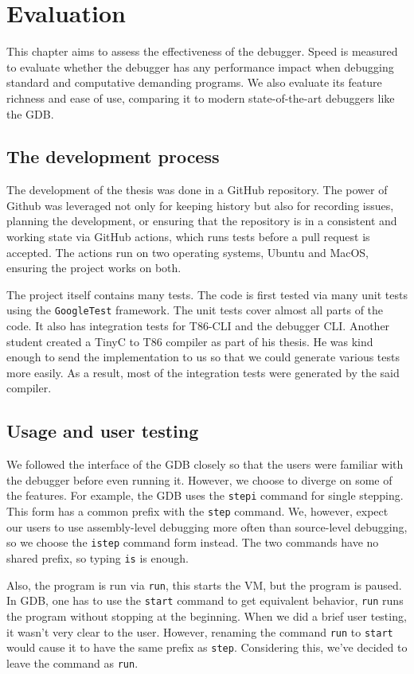 \chapter{Evaluation}
This chapter aims to assess the effectiveness of the debugger. Speed is
measured to evaluate whether the debugger has any performance impact when
debugging standard and computative demanding programs. We also evaluate its
feature richness and ease of use, comparing it to modern state-of-the-art
debuggers like the GDB.

\section{The development process}
The development of the thesis was done in a GitHub repository. The power of
Github was leveraged not only for keeping history but also for recording
issues, planning the development, or ensuring that the repository is in a
consistent and working state via GitHub actions, which runs tests before a pull
request is accepted. The actions run on two operating systems, Ubuntu and
MacOS, ensuring the project works on both.

The project itself contains many tests. The code is first tested via many unit
tests using the \texttt{GoogleTest} framework. The unit tests cover almost all
parts of the code. It also has integration tests for T86-CLI and the debugger
CLI. Another student created a TinyC to T86 compiler as part of
his thesis. He was kind enough to send the implementation to us so that we
could generate various tests more easily. As a result, most of the integration
tests were generated by the said compiler.

\section{Usage and user testing}
We followed the interface of the GDB closely so that the users were familiar
with the debugger before even running it. However, we choose to diverge on some
of the features. For example, the GDB uses the \texttt{stepi} command for
single stepping. This form has a common prefix with the \texttt{step} command.
We, however, expect our users to use assembly-level debugging more often than
source-level debugging, so we choose the \texttt{istep} command form instead.
The two commands have no shared prefix, so typing \texttt{is} is enough.

Also, the program is run via \texttt{run}, this starts the VM, but the program
is paused. In GDB, one has to use the \texttt{start} command to get equivalent
behavior, \texttt{run} runs the program without stopping at the beginning. When
we did a brief user testing, it wasn't very clear to the user. However,
renaming the command \texttt{run} to \texttt{start} would cause it to have the
same prefix as \texttt{step}. Considering this, we've decided to leave the
command as \texttt{run}.

